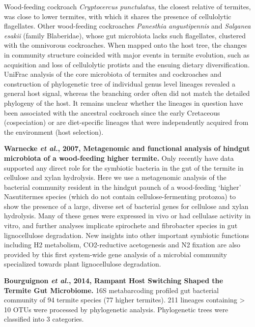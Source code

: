 \documentclass[11pt]{article}
\begin{document}
\begin{sloppypar}
Wood-feeding cockroach \textit{Cryptocercus punctulatus}, the closest relative of termites, was close to lower termites, with which it shares the presence of cellulolytic flagellates. 
Other wood-feeding cockroaches \textit{Panesthia angustipennis} and \textit{Salganea esakii} (family Blaberidae), whose gut microbiota lacks such flagellates, clustered with the omnivorous cockroaches. 
When mapped onto the host tree, the changes in community structure coincided with major events in termite evolution, such as acquisition and loss of cellulolytic protists and the ensuing dietary diversification. 
UniFrac analysis of the core microbiota of termites and cockroaches and construction of phylogenetic tree of individual genus level lineages revealed a general host signal, whereas the branching order often did not match the detailed phylogeny of the host. 
It remains unclear whether the lineages in question have been associated with the ancestral cockroach since the early Cretaceous (cospeciation) or are diet-specific lineages that were independently acquired from the environment (host selection).
\par
\textbf{Warnecke \textit{et al.}, 2007, Metagenomic and functional analysis of hindgut microbiota of a wood-feeding higher termite.} \newline
Only recently have data supported any direct role for the symbiotic bacteria in the gut of the termite in cellulose and xylan hydrolysis. 
Here we use a metagenomic analysis of the bacterial community resident in the hindgut paunch of a wood-feeding ‘higher’ Nasutitermes species (which do not contain cellulose-fermenting protozoa) to show the presence of a large, diverse set of bacterial genes for cellulose and xylan hydrolysis. 
Many of these genes were expressed in vivo or had cellulase activity in vitro, and further analyses implicate spirochete and fibrobacter species in gut lignocellulose degradation. 
New insights into other important symbiotic functions including H2 metabolism, CO2-reductive acetogenesis and N2 fixation are also provided by this first system-wide gene analysis of a microbial community specialized towards plant lignocellulose degradation.
\par
\textbf{Bourguignon \textit{et al.}, 2014, Rampant Host Switching Shaped the Termite Gut Microbiome.} \newline
16S metabarcoding profiled gut bacterial community of 94 termite species (77 higher termites). 
211 lineages containing > 10 OTUs were processed by phylogenetic analysis. 
Phylogenetic trees were classified into 3 categories. 

\end{sloppypar}
\end{document}
